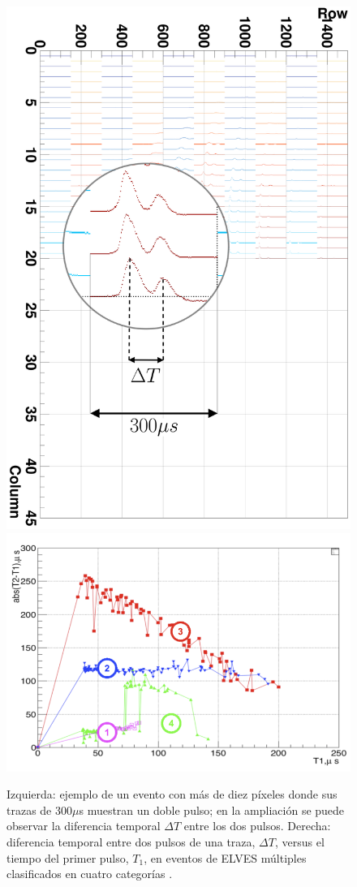 \documentclass[12pt,oneside,openany,letter]{book}
\begin{document}
\begin{figure}
    \centering
    \includegraphics[scale=0.1]{figures/double_elves_1.png}\includegraphics[scale=0.7]{figures/categorias.png}
    \caption[Clasificaci\'on de los ELVES m\'ultiples]{Izquierda: ejemplo de un evento con m\'as de diez p\'ixeles donde sus trazas de 300$\mu$s muestran un doble pulso; en la ampliaci\'on se puede observar la diferencia temporal $\Delta T$ entre los dos pulsos. Derecha: diferencia temporal entre dos pulsos de una traza, $\Delta T$, versus el tiempo del primer pulso, $T_1$, en eventos de ELVES m\'ultiples clasificados en cuatro categor\'ias \cite{Mussa2019}.}
    \label{fig:categorias}
\end{figure}
\end{document}
